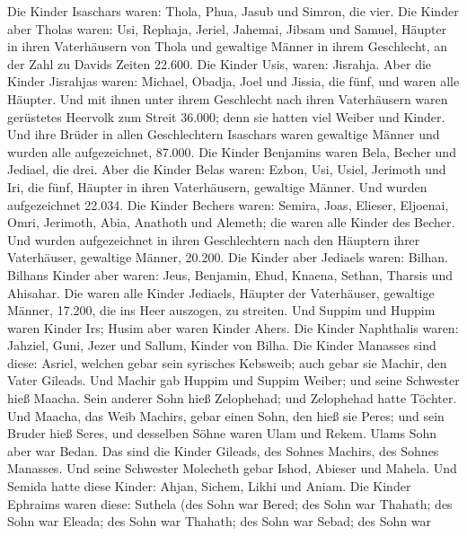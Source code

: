  Die Kinder Isaschars waren: Thola, Phua, Jasub und
Simron, die vier.  Die Kinder aber Tholas waren: Usi,
Rephaja, Jeriel, Jahemai, Jibsam und Samuel, Häupter in ihren
Vaterhäusern von Thola und gewaltige Männer in ihrem Geschlecht, an der
Zahl zu Davids Zeiten 22.600.  Die Kinder Usis, waren:
Jisrahja. Aber die Kinder Jisrahjas waren: Michael, Obadja, Joel und
Jissia, die fünf, und waren alle Häupter.  Und mit ihnen
unter ihrem Geschlecht nach ihren Vaterhäusern waren gerüstetes Heervolk
zum Streit 36.000; denn sie hatten viel Weiber und Kinder.
 Und ihre Brüder in allen Geschlechtern Isaschars waren
gewaltige Männer und wurden alle aufgezeichnet, 87.000. 
Die Kinder Benjamins waren Bela, Becher und Jediael, die drei.
 Aber die Kinder Belas waren: Ezbon, Usi, Usiel, Jerimoth
und Iri, die fünf, Häupter in ihren Vaterhäusern, gewaltige Männer. Und
wurden aufgezeichnet 22.034.  Die Kinder Bechers waren:
Semira, Joas, Elieser, Eljoenai, Omri, Jerimoth, Abia, Anathoth und
Alemeth; die waren alle Kinder des Becher.  Und wurden
aufgezeichnet in ihren Geschlechtern nach den Häuptern ihrer
Vaterhäuser, gewaltige Männer, 20.200.  Die Kinder aber
Jediaels waren: Bilhan. Bilhans Kinder aber waren: Jeus, Benjamin, Ehud,
Knaena, Sethan, Tharsis und Ahisahar.  Die waren alle
Kinder Jediaels, Häupter der Vaterhäuser, gewaltige Männer, 17.200, die
ins Heer auszogen, zu streiten.  Und Suppim und Huppim
waren Kinder Irs; Husim aber waren Kinder Ahers.  Die
Kinder Naphthalis waren: Jahziel, Guni, Jezer und Sallum, Kinder von
Bilha.  Die Kinder Manasses sind diese: Asriel, welchen
gebar sein syrisches Kebsweib; auch gebar sie Machir, den Vater Gileads.
 Und Machir gab Huppim und Suppim Weiber; und seine
Schwester hieß Maacha. Sein anderer Sohn hieß Zelophehad; und Zelophehad
hatte Töchter.  Und Maacha, das Weib Machirs, gebar einen
Sohn, den hieß sie Peres; und sein Bruder hieß Seres, und desselben
Söhne waren Ulam und Rekem.  Ulams Sohn aber war Bedan.
Das sind die Kinder Gileads, des Sohnes Machirs, des Sohnes Manasses.
 Und seine Schwester Molecheth gebar Ishod, Abieser und
Mahela.  Und Semida hatte diese Kinder: Ahjan, Sichem,
Likhi und Aniam.  Die Kinder Ephraims waren diese:
Suthela (des Sohn war Bered; des Sohn war Thahath; des Sohn war Eleada;
des Sohn war Thahath;  des Sohn war Sebad; des Sohn war
